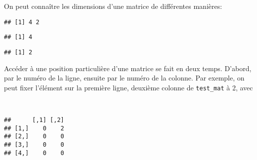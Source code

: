 On peut connaître les dimensions d'une matrice de différentes manières:
\begin{knitrout}
\color{fgcolor}\begin{kframe}
\begin{flushleft}
\ttfamily\noindent
{}\hlkeyword{(}\hlkeyword{)}\mbox{}
\normalfont
\end{flushleft}
\begin{verbatim}
## [1] 4 2
\end{verbatim}
\begin{flushleft}
\ttfamily\noindent
{}\hlkeyword{(}\hlkeyword{)}\mbox{}
\normalfont
\end{flushleft}
\begin{verbatim}
## [1] 4
\end{verbatim}
\begin{flushleft}
\ttfamily\noindent
{}\hlkeyword{(}\hlkeyword{)}\mbox{}
\normalfont
\end{flushleft}
\begin{verbatim}
## [1] 2
\end{verbatim}
\end{kframe}
\end{knitrout}


Accéder à une position particulière d'une matrice se fait en deux temps.
D'abord, par le numéro de la ligne, ensuite par le numéro de la colonne.
Par exemple, on peut fixer l'élément sur la première ligne, deuxième colonne de \texttt{test\_mat} à 2, avec

\begin{knitrout}
\color{fgcolor}\begin{kframe}
\begin{flushleft}
\ttfamily\noindent
{}\hlkeyword{[}\hlkeyword{,}{\ }\hlkeyword{]}{\ }\hlassignement{\usebox{\hlnormalsizeboxlessthan}-}{\ }\hspace*{\fill}\\
\hlstd{}\mbox{}
\normalfont
\end{flushleft}
\begin{verbatim}
##      [,1] [,2]
## [1,]    0    2
## [2,]    0    0
## [3,]    0    0
## [4,]    0    0
\end{verbatim}
\end{kframe}
\end{knitrout}


